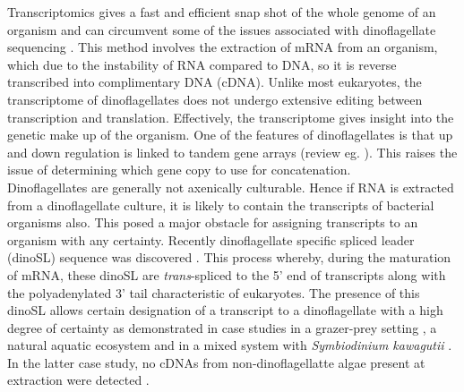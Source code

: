 \documentclass[12pt]{article}
\begin{document}
Transcriptomics gives a fast and efficient snap shot of the whole genome of an organism and can circumvent some of the issues associated with dinoflagellate sequencing \cite{murray2012transcriptomics}. 
This method involves the extraction of mRNA from an organism, which due to the instability of RNA compared to DNA, so it is reverse transcribed into complimentary DNA (cDNA).
Unlike most eukaryotes, the transcriptome of dinoflagellates does not undergo extensive editing between transcription and translation. Effectively, the transcriptome gives insight into the genetic make up of the organism. One of the features of dinoflagellates is that up and down regulation is linked to tandem gene arrays (review eg. \cite{wisecaver2011dinoflagellate}). This raises the issue of determining which gene copy to use for concatenation.
\\

Dinoflagellates are generally not axenically culturable. Hence if RNA is extracted from a dinoflagellate culture, it is likely to contain the transcripts of bacterial organisms also. This posed a major obstacle for assigning transcripts to an organism with any certainty. Recently dinoflagellate specific spliced leader (dinoSL) sequence was discovered \cite{zhang2007spliced}. This process whereby, during the maturation of mRNA, these dinoSL are \emph{trans}-spliced to the 5' end of transcripts along with the polyadenylated 3' tail characteristic of eukaryotes. The presence of this dinoSL allows certain designation of a transcript to a dinoflagellate  with a high degree of certainty as demonstrated in case studies in a grazer-prey setting \cite{lin2010dinoflagellate}, a natural aquatic ecosystem \cite{lin2010spliced} and in a mixed system with \emph{Symbiodinium kawagutii} \cite{zhang2013proof}. In the latter case study, no cDNAs from non-dinoflagellatte algae present at extraction were detected \cite{zhang2013proof}.

\end{document}
